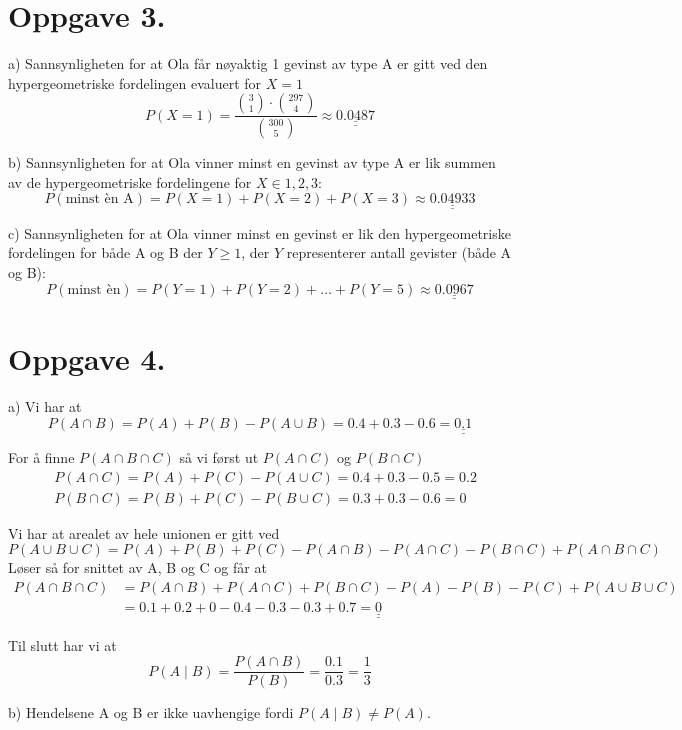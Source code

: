 \documentclass[a4paper,11pt,norsk]{article}
\begin{document}
\section*{Oppgave 3.}
a) Sannsynligheten for at Ola får nøyaktig 1 gevinst av type A er gitt ved den hypergeometriske fordelingen evaluert for $X = 1$
\[
    P(X = 1) = \frac{\binom{3}{1} \cdot \binom{297}{4}}{\binom{300}{5}} \approx \underline{\underline{0.0487}} 
\]

b) Sannsynligheten for at Ola vinner minst en gevinst av type A er lik summen av de hypergeometriske fordelingene for $X \in {1, 2, 3}$:
\[
    P(\text{minst èn A}) = P(X = 1) + P(X = 2) + P(X = 3) \approx \underline{\underline{0.04933}} 
\]

c) Sannsynligheten for at Ola vinner minst en gevinst er lik den hypergeometriske fordelingen for både A og B der $Y \geq 1$, der 
$Y$ representerer antall gevister (både A og B):
\[
    P(\text{minst èn}) = P(Y = 1) + P(Y = 2) + \dots + P(Y = 5) \approx \underline{\underline{0.0967}} 
\]

\section*{Oppgave 4.}
a) Vi har at
\[
    P(A \cap B) = P(A) + P(B) - P(A \cup B) = 0.4 + 0.3 - 0.6 = \underline{\underline{0.1}}
\]

For å finne $P(A \cap B \cap C)$ så vi først ut $P(A \cap C)$ og $P(B \cap C)$
\begin{align*}
    &P(A \cap C) = P(A) + P(C) - P(A \cup C) = 0.4 + 0.3 - 0.5 = 0.2 \\
    &P(B \cap C) = P(B) + P(C) - P(B \cup C) = 0.3 + 0.3 - 0.6 = 0
\end{align*}

Vi har at arealet av hele unionen er gitt ved
\[
    P(A \cup B \cup C) = P(A) + P(B) + P(C) - P(A \cap B) - P(A \cap C) - P(B \cap C) + P(A \cap B \cap C)
\]
Løser så for snittet av A, B og C og får at
\begin{align*}
    P(A \cap B \cap C) &= P(A \cap B) + P(A \cap C) + P(B \cap C) - P(A) - P(B) - P(C) + P(A \cup B \cup C) \\
                       &= 0.1 + 0.2 + 0 - 0.4 - 0.3 -0.3 + 0.7 = \underline{\underline{0}} 
\end{align*}

Til slutt har vi at
\[
    P(A \mid B) = \frac{P(A \cap B)}{P(B)} = \frac{0.1}{0.3} = \frac{1}{3}
\]

b) Hendelsene A og B er ikke uavhengige fordi $P(A \mid B) \neq P(A)$. \\ 
\end{document}
